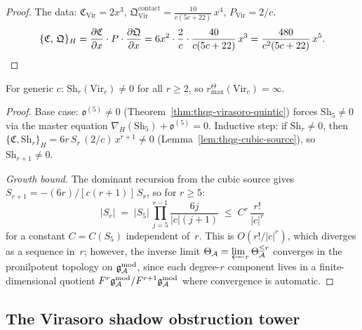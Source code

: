 \begin{proof}
The data: $\mathfrak{C}_{\mathrm{Vir}} = 2x^3$,\;
$\mathfrak{Q}^{\mathrm{contact}}_{\mathrm{Vir}} =
\frac{10}{c(5c+22)}\,x^4$,\;
$P_{\mathrm{Vir}} = 2/c$.
\[
\{\mathfrak{C},\, \mathfrak{Q}\}_{H}
= \frac{\partial\mathfrak{C}}{\partial x}
 \cdot P \cdot
 \frac{\partial\mathfrak{Q}}{\partial x}
= 6x^2 \cdot \frac{2}{c} \cdot
 \frac{40}{c(5c+22)}\,x^3
= \frac{480}{c^2(5c+22)}\,x^5.
\qedhere
\]
\end{proof}

\begin{theorem}
\label{thm:thqg-virasoro-infinite}
\ClaimStatusProvedHere
{}
For generic $c$: $\mathrm{Sh}_r(\mathrm{Vir}_c) \neq 0$
for all $r \geq 2$, so \(r^\Theta_{\max}(\mathrm{Vir}_c)=\infty\).
\end{theorem}

\begin{proof}
Base case: $\mathfrak{o}^{(5)} \neq 0$
(Theorem~\ref{thm:thqg-virasoro-quintic}) forces
$\mathrm{Sh}_5 \neq 0$ via the master equation
$\nabla_H(\mathrm{Sh}_5) + \mathfrak{o}^{(5)} = 0$.
Inductive step: if $\mathrm{Sh}_r \neq 0$, then
$\{\mathfrak{C}, \mathrm{Sh}_r\}_H =
6r\,S_r\,(2/c)\,x^{r+1} \neq 0$
(Lemma~\ref{lem:thqg-cubic-source}), so
$\mathrm{Sh}_{r+1} \neq 0$.

\smallskip\noindent
\emph{Growth bound.}
The dominant recursion from the cubic source gives
$S_{r+1} = -(6r)/[c(r+1)]\,S_r$, so for $r \geq 5$:
\[
|S_r|
\;=\;
|S_5|\,\prod_{j=5}^{r-1} \frac{6j}{|c|(j+1)}
\;\leq\;
C^r\,\frac{r!}{|c|^r}
\]
for a constant $C = C(S_5)$ independent of~$r$. This is
$O(r!/|c|^r)$, which diverges as a sequence in~$r$; however,
the inverse limit $\Theta_{\mathcal{A}} = \varprojlim_r \Theta_{\mathcal{A}}^{\leq r}$
converges in the pronilpotent topology on $\mathfrak{g}_{\mathcal{A}}^{\mathrm{mod}}$, since
each degree-$r$ component lives in a finite-dimensional quotient
$F^r\mathfrak{g}_{\mathcal{A}}^{\mathrm{mod}}/F^{r+1}\mathfrak{g}_{\mathcal{A}}^{\mathrm{mod}}$ where convergence is automatic.
\end{proof}



\subsection{The Virasoro shadow obstruction tower}
\label{subsec:thqg-virasoro-tower}

